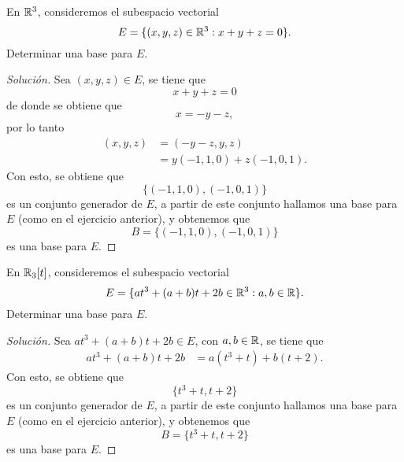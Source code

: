\documentclass[a4,11pt]{aleph-notas}
\begin{document}
\begin{ejer}
    En $\mathbb{R}^3$, consideremos el subespacio vectorial
    \[
        E = \{(x,y,z)\in \mathbb{R}^3 : x+y+z=0 \}.
    \]
    Determinar una base para $E$.
\end{ejer}

\begin{proof}[Solución]
    Sea $(x,y,z)\in E$, se tiene que
    \[
        x+y+z=0
    \]
    de donde se obtiene que 
    \[
        x = -y - z,
    \]
    por lo tanto
    \begin{align*}
        (x,y,z)
            & = (-y - z,y,z) \\
            & = y(-1,1,0) + z(-1,0,1).
    \end{align*}
    Con esto, se obtiene que
    \[
        \{(-1,1,0) , (-1,0,1)\}
    \]
    es un conjunto generador de $E$, a partir de este conjunto hallamos una base para $E$ (como en el ejercicio anterior), y obtenemos que 
    \[
        B = \{(-1,1,0) , (-1,0,1)\}
    \]
    es una base para $E$.
\end{proof}


\begin{ejer}
    En $\mathbb{R}_3[t]$, consideremos el subespacio vectorial
    \[
        E = \{at^3 + (a+b)t + 2b\in \mathbb{R}^3 : a,b\in\mathbb{R} \}.
    \]
    Determinar una base para $E$.
\end{ejer}

\begin{proof}[Solución]
    Sea $at^3 + (a+b)t + 2b\in E$, con $a,b\in\mathbb{R}$, se tiene que
    \begin{align*}
        at^3 + (a+b)t + 2b
            & = a(t^3+t) + b(t+2).
    \end{align*}
    Con esto, se obtiene que
    \[
        \{t^3+t , t+2\}
    \]
    es un conjunto generador de $E$, a partir de este conjunto hallamos una base para $E$ (como en el ejercicio anterior), y obtenemos que 
    \[
        B = \{t^3+t , t+2\}
    \]
    es una base para $E$.
\end{proof}
\end{document}

